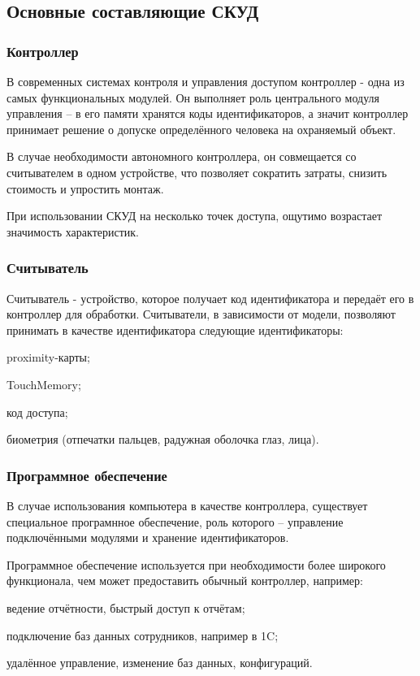 \subsection{Основные составляющие СКУД}

\subsubsection{Контроллер}
В современных системах контроля и управления доступом контроллер - одна из самых функциональных модулей. Он выполняет роль центрального модуля управления -- в его памяти хранятся коды идентификаторов, а значит контроллер принимает решение о допуске определённого человека на охраняемый объект.

В случае необходимости автономного контроллера, он совмещается со считывателем в одном устройстве, что позволяет сократить затраты, снизить стоимость и упростить монтаж.

При использовании СКУД на несколько точек доступа, ощутимо возрастает значимость характеристик.


\subsubsection{Считыватель}
Считыватель - устройство, которое получает код идентификатора и передаёт его в контроллер для обработки. Считыватели, в зависимости от модели, позволяют принимать в качестве идентификатора следующие идентификаторы:

\begin{itemize*}
\item proximity-карты;
\item TouchMemory;
\item код доступа;
\item биометрия (отпечатки пальцев, радужная оболочка глаз, лица).
\end{itemize*}


\subsubsection{Программное обеспечение}
В случае использования компьютера в качестве контроллера, существует специальное програмнное обеспечение, роль которого -- управление подключёнными модулями и хранение идентификаторов.

Программное обеспечение используется при необходимости более широкого функционала, чем может предоставить обычный контроллер, например:

\begin{itemize*}
\item ведение отчётности, быстрый доступ к отчётам;
\item подключение баз данных сотрудников, например в 1C;
\item удалённое управление, изменение баз данных, конфигураций.
\end{itemize*}

